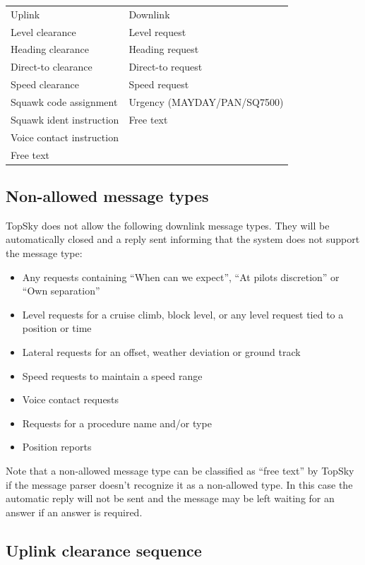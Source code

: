 \documentclass[11pt,a4paper,oldfontcommands]{memoir}
\begin{document}
\begin{tabular}{l l}
  Uplink                      & Downlink\\
  Level clearance             & Level request\\
  Heading clearance           & Heading request\\
  Direct-to clearance         & Direct-to request\\
  Speed clearance             & Speed request\\
  Squawk code assignment      & Urgency (MAYDAY/PAN/SQ7500)\\
  Squawk ident instruction    & Free text\\
  Voice contact instruction   & \\
  Free text                   & \\
\end{tabular}

\subsection{Non-allowed message types}
\label{cpdlc:nmt}

TopSky does not allow the following downlink message types. They will be automatically closed and a reply sent informing that the system does not support the message type:

\begin{itemize}
  \item Any requests containing “When can we expect”, “At pilots discretion” or “Own separation”
  \item Level requests for a cruise climb, block level, or any level request tied to a position or time
  \item Lateral requests for an offset, weather deviation or ground track
  \item Speed requests to maintain a speed range
  \item Voice contact requests
  \item Requests for a procedure name and/or type
  \item Position reports
\end{itemize}

Note that a non-allowed message type can be classified as “free text” by TopSky if the message parser doesn’t recognize it as a non-allowed type. In this case the automatic reply will not be sent and the message may be left waiting for an answer if an answer is required.

\subsection{Uplink clearance sequence}
\label{cpdlc:ucs}
\end{document}
